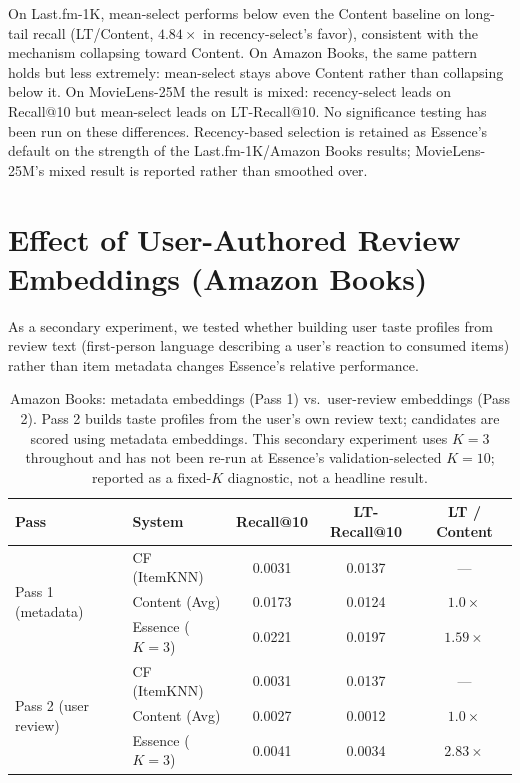 \documentclass{article}
\begin{document}
On Last.fm-1K, mean-select performs below even the Content baseline on long-tail recall (LT/Content, $4.84\times$ in recency-select's favor), consistent with the mechanism collapsing toward Content. On Amazon Books, the same pattern holds but less extremely: mean-select stays above Content rather than collapsing below it. On MovieLens-25M the result is mixed: recency-select leads on Recall@10 but mean-select leads on LT-Recall@10. No significance testing has been run on these differences. Recency-based selection is retained as Essence's default on the strength of the Last.fm-1K/Amazon Books results; MovieLens-25M's mixed result is reported rather than smoothed over.

\section{Effect of User-Authored Review Embeddings (Amazon Books)}
\label{app:pass2}

As a secondary experiment, we tested whether building user taste profiles from review text (first-person language describing a user's reaction to consumed items) rather than item metadata changes Essence's relative performance.

\begin{table}[H]
\centering
\caption{Amazon Books: metadata embeddings (Pass 1) vs.\ user-review embeddings (Pass 2). Pass 2 builds taste profiles from the user's own review text; candidates are scored using metadata embeddings. This secondary experiment uses $K=3$ throughout and has not been re-run at Essence's validation-selected $K=10$; reported as a fixed-$K$ diagnostic, not a headline result.}
\label{tab:amazon_pass2}
\small
\begin{tabular}{llccc}
\toprule
\textbf{Pass} & \textbf{System} & \textbf{Recall@10} & \textbf{LT-Recall@10} & \textbf{LT / Content} \\
\midrule
\multirow{3}{*}{Pass 1 (metadata)}
  & CF (ItemKNN) & 0.0031 & 0.0137 & --- \\
  & Content (Avg) & 0.0173 & 0.0124 & $1.0\times$ \\
  & Essence ($K=3$) & 0.0221 & 0.0197 & $1.59\times$ \\
\midrule
\multirow{3}{*}{Pass 2 (user review)}
  & CF (ItemKNN) & 0.0031 & 0.0137 & --- \\
  & Content (Avg) & 0.0027 & 0.0012 & $1.0\times$ \\
  & Essence ($K=3$) & 0.0041 & 0.0034 & $2.83\times$ \\
\bottomrule
\end{tabular}
\end{table}
\end{document}
